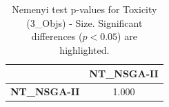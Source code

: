 \begin{table}[h!]
\centering
\scriptsize
\begin{tabular}{lc}
\toprule
 & NT\_NSGA-II \\
\midrule
\textbf{NT\_NSGA-II} & 1.000 \\
\bottomrule
\end{tabular}
\caption{Nemenyi test p-values for Toxicity (3_Objs) - Size. Significant differences ($p < 0.05$) are highlighted.}
\label{tab:nemenyi_nemenyi_Toxicity_3_Objs_Test_Size}
\end{table}